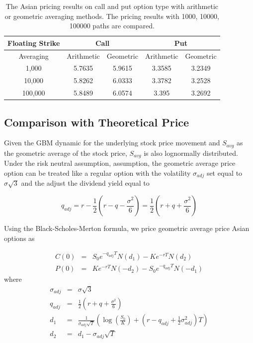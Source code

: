 \documentclass[a4paper,11pt] {article}
\begin{document}
\begin{table}[htb]
\begin{center}
\begin{tabular}{c||c|c|c|c}
  \hline
  Floating Strike & \multicolumn{2}{c|}{Call} & \multicolumn{2}{c}{Put} \\ \hline
  Averaging & Arithmetic & Geometric & Arithmetic & Geometric \\ \hline
  1,000 & 5.7635 & 5.9615 & 3.3585 & 3.2349 \\
  10,000 & 5.8262 & 6.0333 & 3.3782 & 3.2528 \\
  100,000 & 5.8489 & 6.0574 & 3.395 & 3.2692 \\
  \hline
\end{tabular}
\caption{The Asian pricing results on call and put option type with arithmetic or geometric averaging methods. The pricing results with 1000, 10000, 100000 paths are compared.}
\label{table:floating_strike}
\end{center}
\end{table}

\subsection{Comparison with Theoretical Price}
Given the GBM dynamic for the underlying stock price movement and $S_{avg}$ as the geometric average of the stock price, $S_{avg}$ is also lognormally distributed. Under the risk neutral assumption, assumption, the geometric average price option can be treated like a regular option with the volatility $\sigma_{adj}$ set equal to $\sigma\sqrt{3}$ and the adjust the dividend yield equal to

$$
q_{adj} = r - \frac{1}{2} (r-q-\frac{\sigma^2}{6}) = \frac{1}{2} (r+q+\frac{\sigma^2}{6})
$$

Using the Black-Scholes-Merton formula, we price geometric average price Asian options as

\begin{eqnarray*}
C(0) &=& S_0 e^{-q_{adj}T} N(d_1) - Ke^{-rT}N(d_2) \\
P(0) &=& Ke^{-rT}N(-d_2) - S_0 e^{-q_{adj}T} N(-d_1)
\end{eqnarray*}
where
\begin{eqnarray*}
\sigma_{adj} &=& \sigma\sqrt{3} \\
q_{adj} &=& \frac{1}{2} (r+q+\frac{\sigma^2}{6}) \\
d_1 &=& \frac{1}{\sigma_{adj}\sqrt{T}}\left( \log(\frac{S_0}{K})+ (r-q_{adj}+\frac{1}{2}\sigma_{adj}^2)T\right) \\
d_2 &=& d_1 - \sigma_{adj}\sqrt{T}
\end{eqnarray*}
\end{document}
